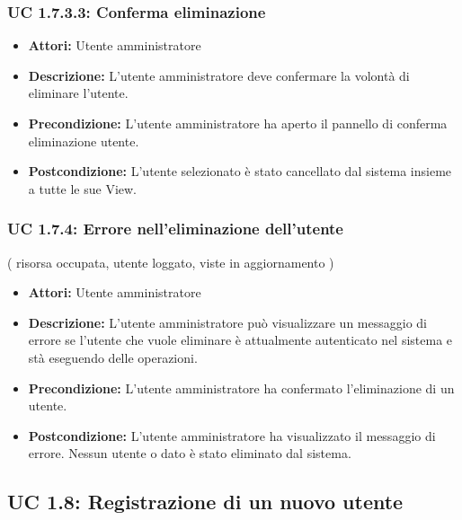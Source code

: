 \subsubsection{UC 1.7.3.3: Conferma eliminazione}

\begin{itemize}
\item \textbf{Attori:} Utente amministratore
\item \textbf{Descrizione:} L'utente amministratore deve confermare la volontà di eliminare l'utente.
\item \textbf{Precondizione:} L'utente amministratore ha aperto il pannello di conferma eliminazione utente.
\item \textbf{Postcondizione:} L'utente selezionato è stato cancellato dal sistema insieme a tutte le sue View.
\end{itemize}

\subsubsection{UC 1.7.4: Errore nell’eliminazione dell'utente}
( risorsa occupata, utente loggato, viste in aggiornamento )

\begin{itemize}
\item \textbf{Attori:} Utente amministratore
\item \textbf{Descrizione:} L'utente amministratore può visualizzare un messaggio di errore se l'utente che vuole eliminare è attualmente autenticato nel sistema e stà eseguendo delle operazioni.
\item \textbf{Precondizione:} L'utente amministratore ha confermato l'eliminazione di un utente.
\item \textbf{Postcondizione:} L'utente amministratore ha visualizzato il messaggio di errore. Nessun utente o dato è stato eliminato dal sistema.
\end{itemize}

\subsection{UC 1.8: Registrazione di un nuovo utente}

